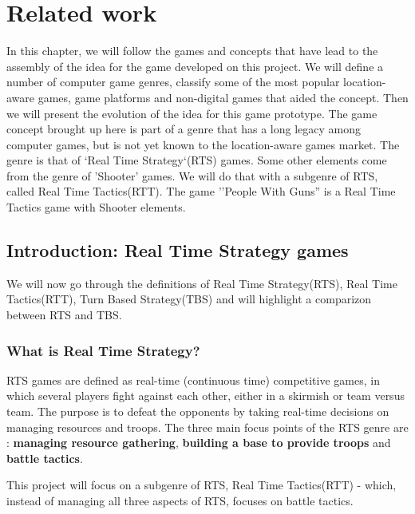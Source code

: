 
\section{Related work}

In this chapter, we will follow the games and concepts that have lead to the
assembly of the idea for the game developed on this project. We will define a
number of computer game genres, classify some of the most popular location-aware
games, game platforms and non-digital games that aided the concept. Then we will
present the evolution of the idea for this game prototype. The game concept
brought up here is part of a genre that has a long legacy among computer games,
but is not yet known to the location-aware games market. The genre is that of
`Real Time Strategy`(RTS)\cite{rts} games. Some other elements come from the
genre of 'Shooter' games\cite{shooter}. We will do that with a subgenre of RTS,
called Real Time Tactics(RTT)\cite{rttvsrts}. The game ''People With Guns'' is a
Real Time Tactics game with Shooter elements.\newline


\subsection{Introduction: Real Time Strategy games}

We will now go through the definitions of Real Time Strategy(RTS), Real Time
Tactics(RTT), Turn Based Strategy(TBS) and will highlight a comparizon between
RTS and TBS.

\subsubsection{What is Real Time Strategy?}

RTS games are defined as real-time (continuous time) competitive games, in which
several players fight against each other, either in a skirmish or team versus
team\cite{rts2}. The purpose is to defeat the opponents by taking real-time
decisions on managing resources and troops\cite{rts3}. The three main focus
points of the RTS genre are : \textbf{managing resource gathering},
\textbf{building a base to provide troops} and \textbf{battle
tactics}.\cite{rts}\newline

This project will focus on a subgenre of RTS, Real Time Tactics(RTT) - which,
instead of managing all three aspects of RTS, focuses on battle tactics.\newline

